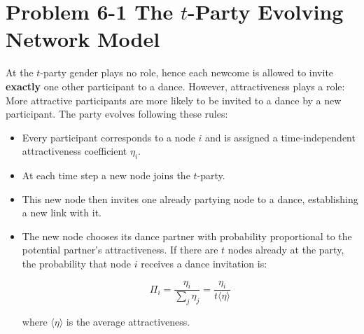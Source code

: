 \section*{Problem 6-1 The $t$-Party Evolving Network Model}

At the $t$-party gender plays no role, hence each newcome is allowed to invite \textbf{exactly} one other participant to a dance. However, attractiveness plays a role: More attractive participants are more likely to be invited to a dance
by a new participant. The party evolves following these rules:

\begin{itemize}
	\item Every participant corresponds to a node $i$ and is assigned a time-independent attractiveness coefficient $\eta_i$.
	\item At each time step a new node joins the $t$-party.
	\item This new node then invites one already partying node to a dance, establishing a new link with it.
	\item The new node chooses its dance partner with probability proportional to the potential partner's attractiveness. If there are $t$ nodes already at the party, the probability that node $i$ receives a dance invitation is:
	
	\begin{equation*}
		\Pi_i = \frac{\eta_i}{\sum_{j}^{} \eta_j} = \frac{\eta_i}{t \langle \eta \rangle}
	\end{equation*}

	where $\langle \eta \rangle$ is the average attractiveness.
\end{itemize}


